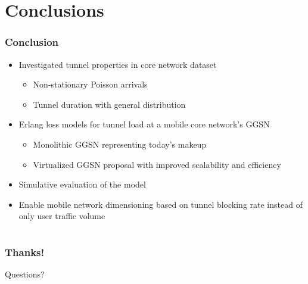 \documentclass{beamer}
\begin{document}
\section{Conclusions}

\begin{frame}
	\frametitle{Conclusion}

	\begin{itemize}
		\item Investigated tunnel properties in core network dataset

		\begin{itemize}
			\item Non-stationary Poisson arrivals
			\item Tunnel duration with general distribution
		\end{itemize}

		\item Erlang loss models for tunnel load at a mobile core network's GGSN
		\begin{itemize}
			\item Monolithic GGSN representing today's makeup
			\item Virtualized GGSN proposal with improved scalability and efficiency
		\end{itemize}

		\item Simulative evaluation of the model

		\item Enable mobile network dimensioning based on tunnel blocking rate instead of only user traffic volume


	\end{itemize}

\end{frame}

\section*{}
\begin{frame}
	\frametitle{Thanks!}

	\centering
		\Large Questions?
\end{frame}

\appendix
{}
\setcounter{finalframe}{\value{framenumber}}

\begin{frame}
\end{frame}
\end{document}
